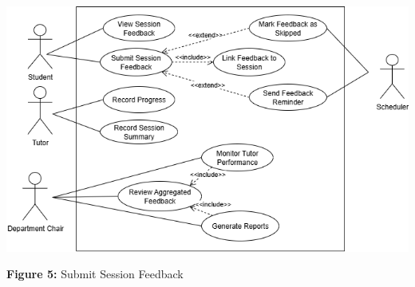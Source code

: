 \begin{center}
\includegraphics[width=0.9\linewidth]{images/UC-04.png}
\end{center}

\begin{center}
\textbf{Figure 5:}  Submit Session Feedback
\end{center}


